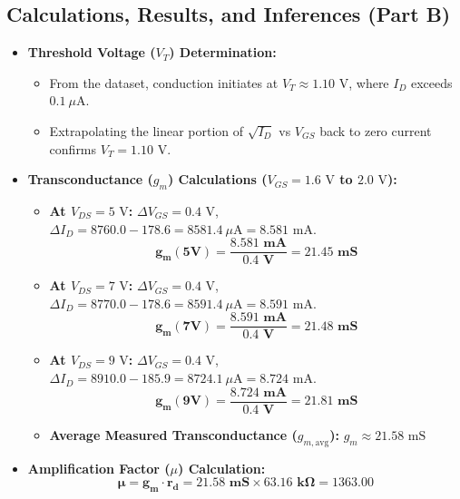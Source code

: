 \documentclass[11pt,a4paper]{article}
\begin{document}
\subsection{Calculations, Results, and Inferences (Part B)}
\begin{itemize}
    \item \textbf{Threshold Voltage ($V_T$) Determination:}
    \begin{itemize}
        \item From the dataset, conduction initiates at \textbf{$V_T \approx 1.10\text{ V}$}, where $I_D$ exceeds $0.1\ \mu\text{A}$.
        \item Extrapolating the linear portion of $\sqrt{I_D}$ vs $V_{GS}$ back to zero current confirms \textbf{$V_T = 1.10\text{ V}$}.
    \end{itemize}

    \item \textbf{Transconductance ($g_m$) Calculations ($V_{GS} = 1.6\text{ V}$ to $2.0\text{ V}$):}
    \begin{itemize}
        \item \textbf{At $V_{DS} = 5\text{ V}$:} $\Delta V_{GS} = 0.4\text{ V}$, $\Delta I_D = 8760.0 - 178.6 = 8581.4\ \mu\text{A} = 8.581\text{ mA}$.
        \[
        \mathbf{g_m(5\text{V}) = \frac{8.581\text{ mA}}{0.4\text{ V}} = 21.45\text{ mS}}
        \]
        \item \textbf{At $V_{DS} = 7\text{ V}$:} $\Delta V_{GS} = 0.4\text{ V}$, $\Delta I_D = 8770.0 - 178.6 = 8591.4\ \mu\text{A} = 8.591\text{ mA}$.
        \[
        \mathbf{g_m(7\text{V}) = \frac{8.591\text{ mA}}{0.4\text{ V}} = 21.48\text{ mS}}
        \]
        \item \textbf{At $V_{DS} = 9\text{ V}$:} $\Delta V_{GS} = 0.4\text{ V}$, $\Delta I_D = 8910.0 - 185.9 = 8724.1\ \mu\text{A} = 8.724\text{ mA}$.
        \[
        \mathbf{g_m(9\text{V}) = \frac{8.724\text{ mA}}{0.4\text{ V}} = 21.81\text{ mS}}
        \]
        \item \textbf{Average Measured Transconductance ($g_{m,\text{avg}}$):} \textbf{$g_m \approx 21.58\text{ mS}$}
    \end{itemize}

    \item \textbf{Amplification Factor ($\mu$) Calculation:}
    \begin{equation}
        \mathbf{\mu = g_m \cdot r_d = 21.58\text{ mS} \times 63.16\text{ k}\Omega = 1363.00}
    \end{equation}


\end{itemize}
\end{document}
